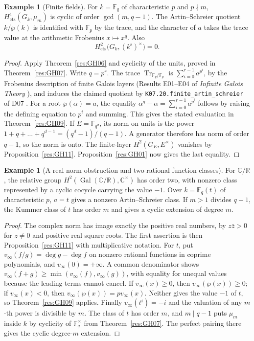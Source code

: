 \documentclass[11pt,oneside,openany]{book}
\theoremstyle{definition}
\newtheorem{example}[theorem]{Example}
\theoremstyle{remark}
\begin{document}
\begin{example}[Finite fields]
\label{res:GH12}
For \(k=\mathbb F_q\) of characteristic \(p\) and \(p\nmid m\),
\(H^1_{\mathrm{cts}}(G_k,\mu_m)\) is cyclic of order
\(\gcd(m,q-1)\). The Artin--Schreier quotient \(k/\wp(k)\)
is identified with \(\mathbb F_p\) by the trace, and the
character of \(a\) takes the trace value at the arithmetic
Frobenius \(x\mapsto x^q\). Also
\[
 H^2_{\mathrm{cts}}\bigl(G_k,(k^{\mathrm s})^\times\bigr)=0.
\]
\end{example}
\begin{proof}
Apply Theorem~\ref{res:GH06} and cyclicity of the units, proved in
Theorem~\ref{res:GH07}. Write \(q=p^r\). The trace
\(\operatorname{Tr}_{\mathbb F_q/\mathbb F_p}\) is
\(\sum_{i=0}^{r-1}a^{p^i}\), by the Frobenius description of
finite Galois layers (Results E01--E04 of \emph{Infinite Galois
Theory} \cite[PDF pp.~18--19]{mg-aft}), and induces the claimed
quotient by \texttt{K07.20.finite\_artin\_schreier} of D07
\cite[PDF p.~173]{mg-d07}. For a root \(\wp(\alpha)=a\),
the equality \(\alpha^q-\alpha=\sum_{i=0}^{r-1}a^{p^i}\) follows
by raising the defining equation to \(p^i\) and summing. This gives
the stated evaluation in Theorem~\ref{res:GH09}.
If \(E=\mathbb F_{q^d}\), its norm on units is the power
\(1+q+\dots+q^{d-1}=(q^d-1)/(q-1)\). A generator therefore has norm
of order \(q-1\), so the norm is onto. The finite-layer
\(H^2(G_E,E^\times)\) vanishes by Proposition~\ref{res:GH11}.
Proposition~\ref{res:GH01} now gives the last equality.
\end{proof}

\begin{example}[A real norm obstruction and two rational-function classes]
\label{res:GH13}
For \(\mathbb C/\mathbb R\), the relative group
\(H^2(\operatorname{Gal}(\mathbb C/\mathbb R),\mathbb C^\times)\)
has order two, with nonzero class represented by a cyclic cocycle
carrying the value \(-1\).
Over \(k=\mathbb F_q(t)\) of characteristic \(p\), \(a=t\) gives a
nonzero Artin--Schreier class. If \(m>1\) divides \(q-1\), the Kummer
class of \(t\) has order \(m\) and gives a cyclic extension of degree
\(m\).
\end{example}
\begin{proof}
The complex norm has image exactly the positive real numbers, by
\(z\bar z>0\) for \(z\ne0\) and positive real square roots. The
first assertion is then Proposition~\ref{res:GH11} with multiplicative
notation. For \(t\), put \(v_\infty(f/g)=\deg g-\deg f\) on
nonzero rational functions in coprime polynomials, and
\(v_\infty(0)=+\infty\). A common denominator shows
\(v_\infty(f+g)\geq\min(v_\infty(f),v_\infty(g))\), with equality
for unequal values because the leading terms cannot cancel.
If \(v_\infty(x)\geq0\), then \(v_\infty(\wp(x))\geq0\); if
\(v_\infty(x)<0\), then \(v_\infty(\wp(x))=p v_\infty(x)\).
Neither gives the value \(-1\) of \(t\), so
Theorem~\ref{res:GH09} applies. Finally \(v_\infty(t^i)=-i\)
and the valuation of any \(m\)-th power is divisible by \(m\).
The class of \(t\) has order \(m\), and \(m\mid q-1\) puts
\(\mu_m\) inside \(k\) by cyclicity of \(\mathbb F_q^\times\)
from Theorem~\ref{res:GH07}. The perfect pairing there gives the
cyclic degree-\(m\) extension.
\end{proof}
\end{document}
